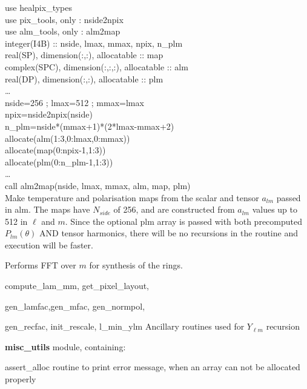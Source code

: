 \begin{example}
{
use healpix\_types \\
use pix\_tools, only : nside2npix \\
use alm\_tools, only : alm2map \\
integer(I4B) :: nside, lmax, mmax, npix, n\_plm\\
real(SP), dimension(:,:), allocatable :: map \\
complex(SPC), dimension(:,:,:), allocatable :: alm \\
real(DP), dimension(:,:), allocatable :: plm \\
\ldots \\
nside=256 ; lmax=512 ; mmax=lmax\\
npix=nside2npix(nside)\\
n\_plm=nside*(mmax+1)*(2*lmax-mmax+2)\\
allocate(alm(1:3,0:lmax,0:mmax))\\
allocate(map(0:npix-1,1:3))\\
allocate(plm(0:n\_plm-1,1:3))\\
\ldots \\
call alm2map(nside, lmax, mmax, alm, map, plm)  \\
}
{
Make temperature and polarisation maps from the scalar and tensor $a_{lm}$
passed in alm. The maps have $N_{side}$ of 256, and are constructed from
$a_{lm}$ values up to 512 in $\ell$ and $m$. Since the optional plm array is
passed with both precomputed $P_{lm}(\theta)$ AND tensor harmonics, there will
be no recursions in the routine and execution will be faster. 
}
\end{example}

\begin{modules}
  \begin{sulist}{} %
  \item[\htmlref{ring\_synthesis}{sub:ring_synthesis}] Performs FFT over $m$ for synthesis of the rings.
  \item[compute\_lam\_mm, get\_pixel\_layout, ]
  \item[gen\_lamfac,gen\_mfac, gen\_normpol, ] 
  \item[gen\_recfac, init\_rescale, l\_min\_ylm] Ancillary routines used
  for $Y_{\ell m}$ recursion
  \item[\textbf{misc\_utils}] module, containing:
  \item[assert\_alloc] routine to print error message, when an array can not be
  allocated properly
  \end{sulist}
\end{modules}

